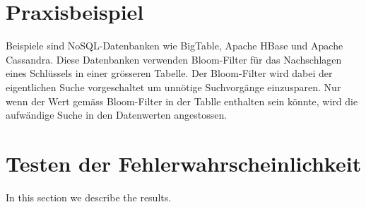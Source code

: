 \documentclass[12pt]{article}
\begin{document}
\section{Praxisbeispiel}
Beispiele sind NoSQL-Datenbanken wie BigTable, Apache HBase und Apache Cassandra. Diese Datenbanken verwenden Bloom-Filter für das Nachschlagen eines Schlüssels in einer grösseren Tabelle. Der Bloom-Filter wird dabei der eigentlichen Suche vorgeschaltet um unnötige Suchvorgänge einzusparen. Nur wenn der Wert gemäss Bloom-Filter in der Tablle enthalten sein könnte, wird die aufwändige Suche in den Datenwerten angestossen.

\section{Testen der Fehlerwahrscheinlichkeit}
In this section we describe the results.
\end{document}
